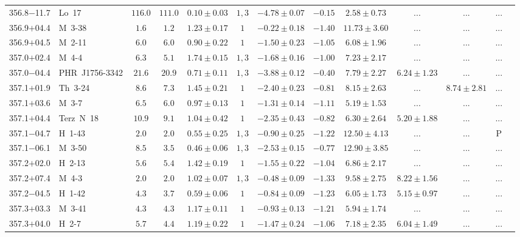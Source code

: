 \documentclass[useAMS]{mn2e}
\begin{document}
\begin{center}
{\begin{longtable}{llccccccccccc}
356.8$-$11.7&Lo~17&$     116.0$&$     111.0$&$0.10 \pm 0.03$&$1,3$&$-4.78 \pm 0.07$&$     -0.15$&$2.58 \pm 0.73$&$...$&$...$&...\\
356.9$+$04.4&M~3-38&$       1.6$&$       1.2$&$1.23 \pm 0.17$&$1$&$-0.22 \pm 0.18$&$     -1.40$&$11.73 \pm 3.60$&$...$&$...$&...\\
356.9$+$04.5&M~2-11&$       6.0$&$       6.0$&$0.90 \pm 0.22$&$1$&$-1.50 \pm 0.23$&$     -1.05$&$6.08 \pm 1.96$&$...$&$...$&...\\
357.0$+$02.4&M~4-4&$       6.3$&$       5.1$&$1.74 \pm 0.15$&$1,3$&$-1.68 \pm 0.16$&$     -1.00$&$7.23 \pm 2.17$&$...$&$...$&...\\
357.0$-$04.4&PHR~J1756-3342&$      21.6$&$      20.9$&$0.71 \pm 0.11$&$1,3$&$-3.88 \pm 0.12$&$     -0.40$&$7.79 \pm 2.27$&$6.24 \pm 1.23$&$...$&...\\
357.1$+$01.9&Th~3-24&$       8.6$&$       7.3$&$1.45 \pm 0.21$&$1$&$-2.40 \pm 0.23$&$     -0.81$&$8.15 \pm 2.63$&$...$&$8.74 \pm 2.81$&...\\
357.1$+$03.6&M~3-7&$       6.5$&$       6.0$&$0.97 \pm 0.13$&$1$&$-1.31 \pm 0.14$&$     -1.11$&$5.19 \pm 1.53$&$...$&$...$&...\\
357.1$+$04.4&Terz~N~18&$      10.9$&$       9.1$&$1.04 \pm 0.42$&$1$&$-2.35 \pm 0.43$&$     -0.82$&$6.30 \pm 2.64$&$5.20 \pm 1.88$&$...$&...\\
357.1$-$04.7&H~1-43&$       2.0$&$       2.0$&$0.55 \pm 0.25$&$1,3$&$-0.90 \pm 0.25$&$     -1.22$&$12.50 \pm 4.13$&$...$&$...$&P\\
357.1$-$06.1&M~3-50&$       8.5$&$       3.5$&$0.46 \pm 0.06$&$1,3$&$-2.53 \pm 0.15$&$     -0.77$&$12.90 \pm 3.85$&$...$&$...$&...\\
357.2$+$02.0&H~2-13&$       5.6$&$       5.4$&$1.42 \pm 0.19$&$1$&$-1.55 \pm 0.22$&$     -1.04$&$6.86 \pm 2.17$&$...$&$...$&...\\
357.2$+$07.4&M~4-3&$       2.0$&$       2.0$&$1.02 \pm 0.07$&$1,3$&$-0.48 \pm 0.09$&$     -1.33$&$9.58 \pm 2.75$&$8.22 \pm 1.56$&$...$&...\\
357.2$-$04.5&H~1-42&$       4.3$&$       3.7$&$0.59 \pm 0.06$&$1$&$-0.84 \pm 0.09$&$     -1.23$&$6.05 \pm 1.73$&$5.15 \pm 0.97$&$...$&...\\
357.3$+$03.3&M~3-41&$       4.3$&$       4.3$&$1.17 \pm 0.11$&$1$&$-0.93 \pm 0.13$&$     -1.21$&$5.94 \pm 1.74$&$...$&$...$&...\\
357.3$+$04.0&H~2-7&$       5.7$&$       4.4$&$1.19 \pm 0.22$&$1$&$-1.47 \pm 0.24$&$     -1.06$&$7.18 \pm 2.35$&$6.04 \pm 1.49$&$...$&...\\

\end{longtable}}
\end{center}
\end{document}
